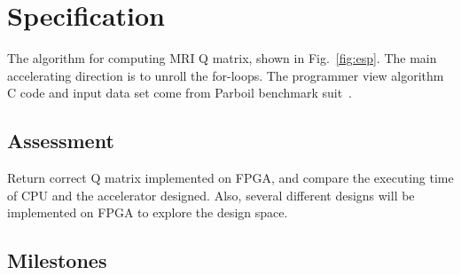 \documentclass{sig-alternate}
\begin{document}
\section{Specification}
The algorithm for computing MRI Q matrix, shown in Fig.~\ref{fig:esp}. The main accelerating direction is to unroll the for-loops. The programmer view algorithm C code and input data set come from Parboil benchmark suit~\cite{Rub1}.



\subsection{Assessment}
Return correct Q matrix implemented on FPGA, and compare the executing time of CPU and the accelerator designed. Also, several different designs will be implemented on FPGA to explore the design space.

\subsection{Milestones}\label{sec:arch}
\label{sec:milestones}
\end{document}
